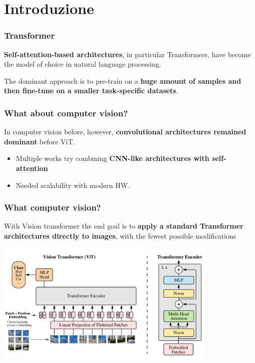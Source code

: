 
\section{Introduzione} %


\begin{frame}
\frametitle{Transformer}
\textbf{Self-attention-based architectures}, in particular Transformers, have become the model of choice in natural language processing.
\vspace{0.5cm}

The dominant approach is to pre-train on a \textbf{huge amount of samples and then fine-tune on a smaller task-specific datasets}.

\end{frame}

\begin{frame}
\frametitle{What about computer vision?}
In computer vision before, however, \textbf{convolutional architectures remained dominant} before ViT.

\begin{itemize}
    \item Multiple works try combining \textbf{CNN-like architectures with self-attention}
    \item Needed scalability with modern HW.
\end{itemize}

\end{frame}

\begin{frame}
\frametitle{What computer vision?}
With Vision transformer the end goal is to \textbf{apply a standard Transformer architectures directly to images}, with the fewest possible modifications
\begin{center}
    \includegraphics[width=0.8\textwidth]{img/1-section/Vision transformer.png} 
\end{center}

\end{frame}